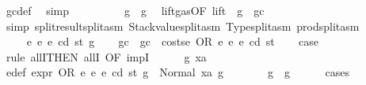 \begin{isabellebody}
\ gc{\isacharunderscore}{\kern0pt}def\ \isamarkupfalse%
\ simp\isanewline
\ \ \ \ \ \ \isamarkupfalse%
\ \isamarkupfalse%
\ {\isachardoublequoteopen}g{}\ {\isasymle}\ g{\isachardoublequoteclose}\ \isamarkupfalse%
\ lift{\isacharunderscore}{\kern0pt}gas{\isacharbrackleft}{\kern0pt}OF\ lift{\isacharbrackright}{\kern0pt}\ {\isacharbackquoteopen}{\isasymnot}\ g\ {\isasymle}\ gc{\isacharbackquoteclose}\ \isamarkupfalse%
\ {\isacharparenleft}{\kern0pt}simp\ split{\isacharcolon}{\kern0pt}result{\isachardot}{\kern0pt}split{\isacharunderscore}{\kern0pt}asm\ Stackvalue{\isachardot}{\kern0pt}split{\isacharunderscore}{\kern0pt}asm\ Type{\isachardot}{\kern0pt}split{\isacharunderscore}{\kern0pt}asm\ prod{\isachardot}{\kern0pt}split{\isacharunderscore}{\kern0pt}asm{\isacharparenright}{\kern0pt}\isanewline
\ \ \ \ \isamarkupfalse%
\isanewline
\ \ \isamarkupfalse%
\isanewline
{}\isamarkupfalse%
\isanewline
\ \ \isamarkupfalse%
\ {\isacharparenleft}{\kern0pt}{}{}\ e{}\ e{}\ e\ cd\ st\ g{\isacharparenright}{\kern0pt}\isanewline
\ \ \isamarkupfalse%
\ gc\ \ {\isachardoublequoteopen}gc\ {\isacharequal}{\kern0pt}\ costs\isactrlsub e\ {\isacharparenleft}{\kern0pt}OR\ e{}\ e{}{\isacharparenright}{\kern0pt}\ e\ cd\ st{\isachardoublequoteclose}\isanewline
\ \ \isamarkupfalse%
\ {\isacharquery}{\kern0pt}case\isanewline
\ \ \isamarkupfalse%
\ {\isacharparenleft}{\kern0pt}rule\ allI{\isacharbrackleft}{\kern0pt}THEN\ allI{\isacharcomma}{\kern0pt}\ OF\ impI{\isacharbrackright}{\kern0pt}{\isacharparenright}{\kern0pt}\isanewline
\ \ \ \ \isamarkupfalse%
\ g{}\ xa\ \isamarkupfalse%
\ e{\isacharunderscore}{\kern0pt}def{\isacharcolon}{\kern0pt}\ {\isachardoublequoteopen}expr\ {\isacharparenleft}{\kern0pt}OR\ e{}\ e{}{\isacharparenright}{\kern0pt}\ e\ cd\ st\ g\ {\isacharequal}{\kern0pt}\ Normal\ {\isacharparenleft}{\kern0pt}xa{\isacharcomma}{\kern0pt}\ g{}{\isacharparenright}{\kern0pt}{\isachardoublequoteclose}\isanewline
\ \ \ \ \isamarkupfalse%
\ \isamarkupfalse%
\ {\isachardoublequoteopen}g{}\ {\isasymle}\ g{\isachardoublequoteclose}\isanewline
\ \ \ \ \isamarkupfalse%
\ {\isacharparenleft}{\kern0pt}cases{\isacharparenright}{\kern0pt}\isanewline

\end{isabellebody}
